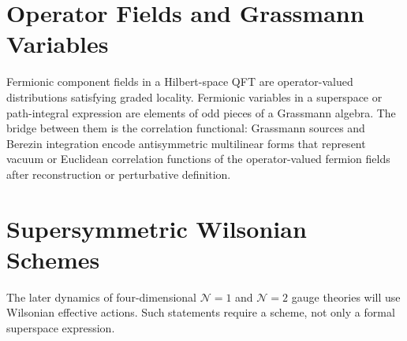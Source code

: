 \section{Operator Fields and Grassmann Variables}

Fermionic component fields in a Hilbert-space QFT are operator-valued
distributions satisfying graded locality.  Fermionic variables in a
superspace or path-integral expression are elements of odd pieces of a
Grassmann algebra.  The bridge between them is the correlation functional:
Grassmann sources and Berezin integration encode antisymmetric multilinear
forms that represent vacuum or Euclidean correlation functions of the
operator-valued fermion fields after reconstruction or perturbative
definition.

\section{Supersymmetric Wilsonian Schemes}

The later dynamics of four-dimensional \(\mathcal N=1\) and \(\mathcal N=2\)
gauge theories will use Wilsonian effective actions.  Such statements require
a scheme, not only a formal superspace expression.

